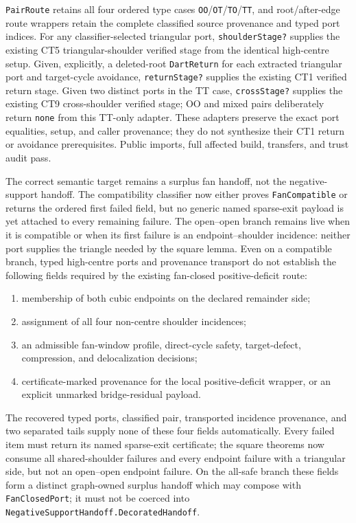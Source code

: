 \documentclass[11pt]{article}
\begin{document}
\texttt{PairRoute} retains all four ordered type cases
\texttt{OO}/\texttt{OT}/\texttt{TO}/\texttt{TT}, and root/after-edge route
wrappers retain the complete classified source provenance and typed port
indices.  For any classifier-selected triangular port,
\texttt{shoulderStage?} supplies the existing CT5 triangular-shoulder verified
stage from the identical high-centre setup.  Given, explicitly, a deleted-root
\texttt{DartReturn} for each extracted triangular port and target-cycle
avoidance, \texttt{returnStage?} supplies the existing CT1 verified return
stage.  Given two distinct ports in the TT case,
\texttt{crossStage?} supplies the existing CT9 cross-shoulder verified stage;
OO and mixed pairs deliberately return \texttt{none} from this TT-only
adapter.  These adapters preserve the exact port equalities, setup, and caller
provenance; they do not synthesize their CT1 return or avoidance prerequisites.
Public imports, full affected build, transfers, and trust audit pass.

The correct semantic target remains a surplus fan handoff, not the
negative-support handoff.  The compatibility classifier now either proves
\texttt{FanCompatible} or returns the ordered first failed field, but no
generic named sparse-exit payload is yet attached to every remaining failure.
The open--open branch remains live when it is compatible or when its first
failure is an endpoint--shoulder incidence: neither port supplies the triangle
needed by the square lemma.  Even on a compatible branch, typed high-centre
ports and provenance
transport do not establish the following fields required by the existing
fan-closed positive-deficit route:
\begin{enumerate}
\item membership of both cubic endpoints on the declared remainder side;
\item assignment of all four non-centre shoulder incidences;
\item an admissible fan-window profile, direct-cycle safety, target-defect,
compression, and delocalization decisions;
\item certificate-marked provenance for the local positive-deficit wrapper,
or an explicit unmarked bridge-residual payload.
\end{enumerate}
The recovered typed ports, classified pair, transported incidence provenance,
and two separated tails supply none of these four fields automatically.  Every failed item must
return its named sparse-exit certificate; the square theorems now consume all
shared-shoulder failures and every endpoint failure with a triangular side,
but not an open--open endpoint failure.  On the all-safe branch these fields form a
distinct graph-owned surplus handoff which may compose with
\texttt{FanClosedPort}; it must not be coerced into
\texttt{NegativeSupportHandoff.DecoratedHandoff}.
\end{document}
